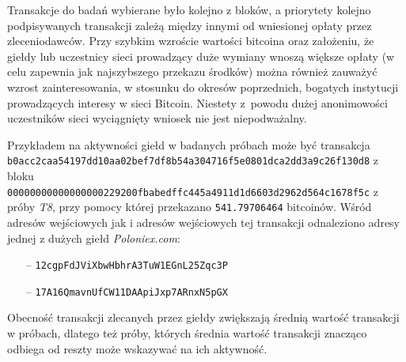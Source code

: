 \documentclass[12pt, twoside, final, openany]{mgr}
\begin{document}
\indent Transakcje do badań wybierane było kolejno z bloków, a priorytety kolejno podpisywanych transakcji zależą między innymi od wniesionej opłaty przez zleceniodawców. Przy szybkim wzroście wartości bitcoina oraz założeniu, że giełdy lub uczestnicy sieci prowadzący duże wymiany wnoszą większe opłaty (w celu zapewnia jak najszybszego przekazu środków) można również zauważyć wzrost zainteresowania, w stosunku do okresów poprzednich, bogatych instytucji prowadzących interesy w sieci Bitcoin. Niestety z~powodu dużej anonimowości uczestników sieci wyciągnięty wniosek nie jest niepodważalny. 

\indent Przykładem na aktywności giełd w badanych próbach może być transakcja\\\texttt{b0acc2caa54197dd10aa02bef7df8b54a304716f5e0801dca2dd3a9c26f130d8} z bloku\\ \texttt{00000000000000000229200fbabedffc445a4911d1d6603d2962d564c1678f5c} z próby \textit{T8}, przy pomocy której przekazano \texttt{541.79706464} bitcoinów. Wśród adresów wejściowych jak i adresów wejściowych tej transakcji odnaleziono adresy jednej z dużych giełd \textit{Poloniex.com}\cite{poloniex}:
\begin{itemize}
\item[--] \texttt{12cgpFdJViXbwHbhrA3TuW1EGnL25Zqc3P}
\item[--] \texttt{17A16QmavnUfCW11DAApiJxp7ARnxN5pGX}
\end{itemize}
Obecność transakcji zlecanych przez giełdy zwiększają średnią wartość transakcji w próbach, dlatego też próby, których średnia wartość transakcji znacząco odbiega od reszty może wskazywać na ich aktywność.
\end{document}
